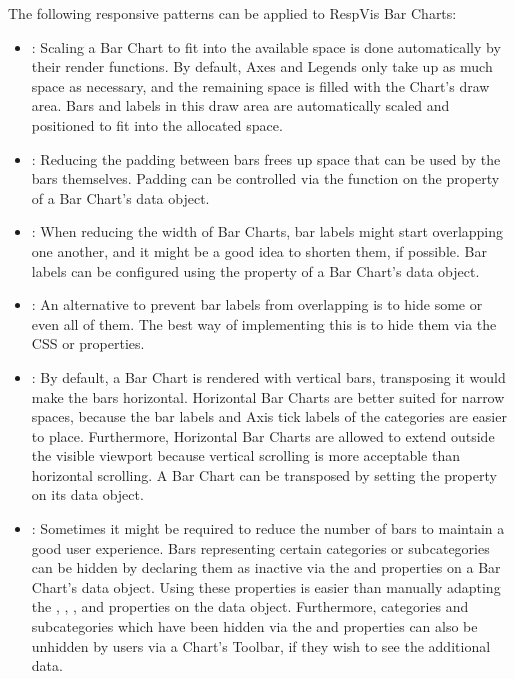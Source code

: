 The following responsive patterns can be applied to RespVis Bar Charts:
\begin{itemize}
\item {}: Scaling a Bar Chart to fit into the
  available space is done automatically by their render functions. By
  default, Axes and Legends only take up as much space as necessary,
  and the remaining space is filled with the Chart's draw area. Bars
  and labels in this draw area are automatically scaled and positioned
  to fit into the allocated space.

\item {}: Reducing the padding between bars
  frees up space that can be used by the bars themselves. Padding
  can be controlled via the  function on the
   property of a Bar Chart's data object.

\item {}: When reducing the width of Bar
  Charts, bar labels might start overlapping one another, and it might
  be a good idea to shorten them, if possible. Bar labels can be
  configured using the  property of a Bar Chart's data
  object.

\item {}: An alternative to prevent bar
  labels from overlapping is to hide some or even all of them. The
  best way of implementing this is to hide them via the CSS
   or  properties.

\item {}: By default, a Bar Chart is rendered
  with vertical bars, transposing it would make the bars horizontal.
  Horizontal Bar Charts are better suited for narrow spaces, because
  the bar labels and Axis tick labels of the categories are easier to
  place. Furthermore, Horizontal Bar Charts are allowed to extend
  outside the visible viewport because vertical scrolling is more
  acceptable than horizontal scrolling. A Bar Chart can be transposed
  by setting the  property on its data object.

\item {}: Sometimes it might be required to reduce
  the number of bars to maintain a good user experience. Bars
  representing certain categories or subcategories can be hidden by
  declaring them as inactive via the  and
   properties on a Bar Chart's data object.
  Using these properties is easier than manually adapting the
  , , , and
   properties on the data object. Furthermore,
  categories and subcategories which have been hidden via the
   and  properties
  can also be unhidden by users via a Chart's Toolbar, if they wish to
  see the additional data.


\end{itemize}
